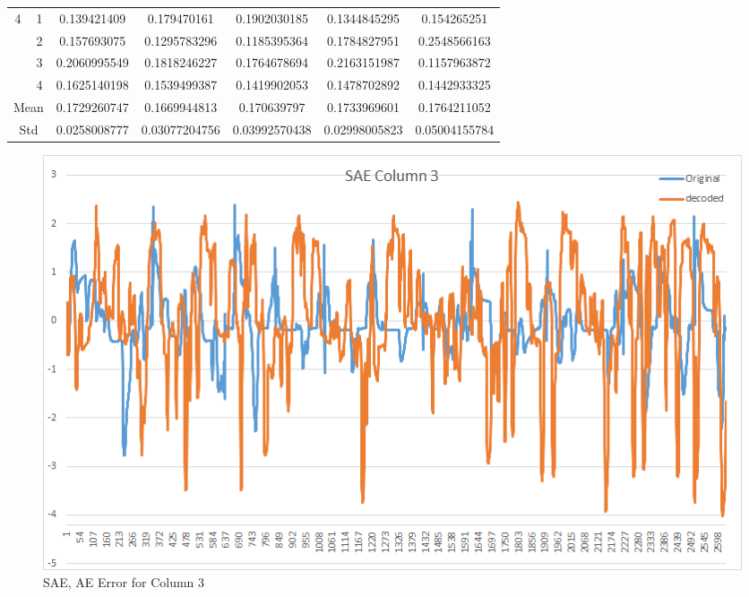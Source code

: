 \documentclass[draft,dvipsnames]{drexel-thesis}
\begin{document}
\begin{thesis}
\begin{table}[!t]
\begin{tabular}{|c|c|c|c|c|c|c|}
\multirow{4}{*}{4}    & 1                   & 0.139421409  & 0.179470161   & 0.1902030185  & 0.1344845295  & 0.154265251   \\ \cline{2-7} 
                      & 2                   & 0.157693075  & 0.1295783296  & 0.1185395364  & 0.1784827951  & 0.2548566163  \\ \cline{2-7} 
                      & 3                   & 0.2060995549 & 0.1818246227  & 0.1764678694  & 0.2163151987  & 0.1157963872  \\ \cline{2-7} 
                      & 4                   & 0.1625140198 & 0.1539499387  & 0.1419902053  & 0.1478702892  & 0.1442933325  \\ \hline
\multicolumn{2}{|c|}{Mean}                  & 0.1729260747 & 0.1669944813  & 0.170639797   & 0.1733969601  & 0.1764211052  \\ \hline
\multicolumn{2}{|c|}{Std}                   & 0.0258008777 & 0.03077204756 & 0.03992570438 & 0.02998005823 & 0.05004155784 \\ \hline
\end{tabular}
\end{table}

\begin{figure}[t!]
    \centering
    \includegraphics[width=\textwidth]{pictures/result_pictures/SAE_Column_3.png}
    \caption{SAE, AE Error for Column 3}
    \label{fig:sae_error_c3}
\end{figure}


\end{thesis}
\end{document}

